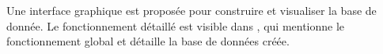 
Une interface graphique est proposée pour construire et visualiser la base de donnée.
Le fonctionnement détaillé est visible dans \cite{Lequievre08}, qui mentionne le fonctionnement global et détaille la base de données créée.
